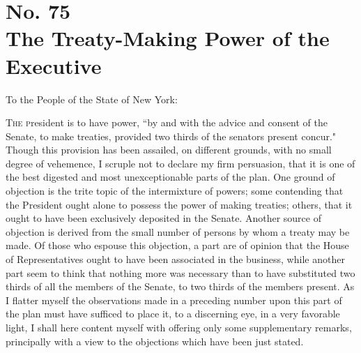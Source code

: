 \chapter[No. 75: The Treaty-Making Power of the Executive]{No. 75\\ {\small The Treaty-Making Power of the Executive}}
To the People of the State of New York:
\vspace{.25cm}

\textsc{The p}resident is to have power, ``by and with the advice and consent of the Senate, to make treaties, provided two thirds of the senators present concur." Though this provision has been assailed, on different grounds, with no small degree of vehemence, I scruple not to declare my firm persuasion, that it is one of the best digested and most unexceptionable parts of the plan. One ground of objection is the trite topic of the intermixture of powers; some contending that the President ought alone to possess the power of making treaties; others, that it ought to have been exclusively deposited in the Senate. Another source of objection is derived from the small number of persons by whom a treaty may be made. Of those who espouse this objection, a part are of opinion that the House of Representatives ought to have been associated in the business, while another part seem to think that nothing more was necessary than to have substituted two thirds of all the members of the Senate, to two thirds of the members present. As I flatter myself the observations made in a preceding number upon this part of the plan must have sufficed to place it, to a discerning eye, in a very favorable light, I shall here content myself with offering only some supplementary remarks, principally with a view to the objections which have been just stated.


